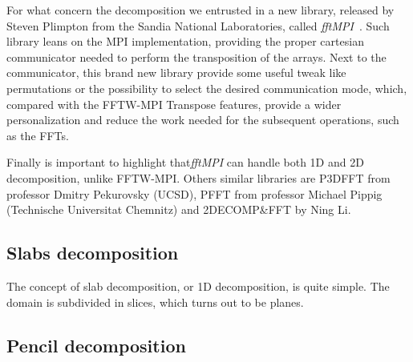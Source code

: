 \par
For what concern the decomposition we entrusted in a new library, released by Steven Plimpton from the Sandia National Laboratories, called \emph{fftMPI}~\cite{fftMPI}. Such library leans on the MPI implementation, providing the proper cartesian communicator needed to perform the transposition of the arrays. Next to the communicator, this brand new library provide some useful tweak like permutations or the possibility to select the desired communication mode, which, compared with the FFTW-MPI Transpose\cite{FFTW05}\cite{FFTW:transpose} features, provide a wider personalization and reduce the work needed for the subsequent operations, such as the FFTs. 
\par
Finally is important to highlight that\emph{fftMPI} can handle both 1D and 2D decomposition, unlike FFTW-MPI.
Others similar libraries are P3DFFT\cite{p3dfft} from professor Dmitry Pekurovsky (UCSD), PFFT from professor Michael Pippig\cite{pfft} (Technische Universitat Chemnitz) and 2DECOMP\&FFT\cite{2decomp} by Ning Li.





\subsection{Slabs decomposition}
The concept of slab decomposition, or 1D decomposition, is quite simple. The domain is subdivided in slices, which turns out to be planes.


\subsection{Pencil decomposition}

